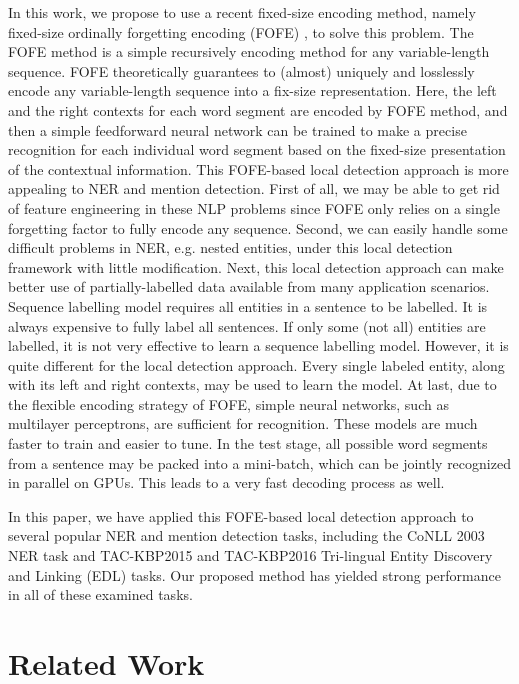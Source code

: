 \documentclass[11pt,a4paper]{article}
\begin{document}
In this work, we propose to use a recent fixed-size encoding method, namely fixed-size ordinally forgetting encoding (FOFE) \cite{zhang2015fixed}, to solve this problem.  The FOFE method is a simple recursively encoding method for any variable-length sequence. FOFE theoretically guarantees to (almost) uniquely and losslessly encode any variable-length sequence into a fix-size representation. Here, the left and the right contexts for each word segment are encoded by FOFE method, and then a simple feedforward neural network can be trained to make a precise recognition for each individual word segment based on the fixed-size presentation of the contextual information. This FOFE-based local detection approach is more appealing to NER and mention detection. First of all, we may be able to get rid of feature engineering in these NLP problems since FOFE only relies on a single forgetting factor to fully encode any sequence. Second, we can easily handle some difficult problems in NER, e.g. nested entities, under this local detection framework with little modification. Next, this local detection approach can make better use of partially-labelled data available from many application scenarios. Sequence labelling model requires all entities in a sentence to be labelled. It is always expensive to fully label all sentences. If only some (not all) entities are labelled, it is not very effective to learn a sequence labelling model. However, it is quite different for the local detection approach. Every single labeled entity, along with its left and right contexts, may be used to learn the model. At last, due to the flexible encoding strategy of FOFE, simple neural networks, such as multilayer perceptrons, are sufficient for recognition. These models are much faster to train and easier to tune. In the test stage, all possible word segments from a sentence may be packed into a mini-batch, which can be jointly recognized in parallel on GPUs. This leads to a very fast decoding process as well.

In this paper, we have applied this FOFE-based local detection approach to several popular NER and mention detection tasks, including the CoNLL 2003 NER task and 
TAC-KBP2015 and TAC-KBP2016 Tri-lingual Entity Discovery and Linking (EDL) tasks.
Our proposed method has yielded strong performance in all of these examined tasks. 

\section{Related Work}
\label{sec_related_work}
\end{document}

